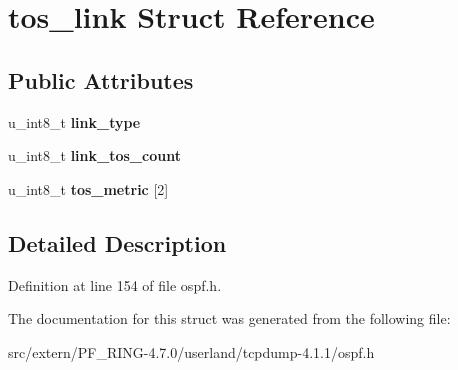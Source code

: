 \hypertarget{structtos__link}{
\section{tos\_\-link Struct Reference}
\label{structtos__link}
}
\subsection*{Public Attributes}
\begin{DoxyCompactItemize}
\item 
\hypertarget{structtos__link_acf001ccb24d9c5cc5e6d4630383ca86a}{
u\_\-int8\_\-t {\bfseries link\_\-type}}
\label{structtos__link_acf001ccb24d9c5cc5e6d4630383ca86a}

\item 
\hypertarget{structtos__link_a70f697a220f9f9738b5ddbe71899a099}{
u\_\-int8\_\-t {\bfseries link\_\-tos\_\-count}}
\label{structtos__link_a70f697a220f9f9738b5ddbe71899a099}

\item 
\hypertarget{structtos__link_af842d0e82f7844325873eba012937c9f}{
u\_\-int8\_\-t {\bfseries tos\_\-metric} \mbox{[}2\mbox{]}}
\label{structtos__link_af842d0e82f7844325873eba012937c9f}

\end{DoxyCompactItemize}


\subsection{Detailed Description}


Definition at line 154 of file ospf.h.



The documentation for this struct was generated from the following file:\begin{DoxyCompactItemize}
\item 
src/extern/PF\_\-RING-\/4.7.0/userland/tcpdump-\/4.1.1/ospf.h\end{DoxyCompactItemize}
